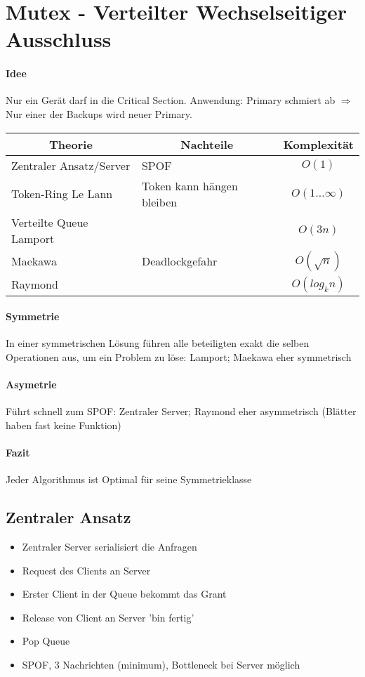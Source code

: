 \documentclass{scrartcl}
\begin{document}
%
%

\section{Mutex - Verteilter Wechselseitiger Ausschluss} \label{mutex}
\paragraph{Idee} Nur ein Gerät darf in die Critical Section. Anwendung: Primary schmiert ab $\Rightarrow$ Nur einer der Backups wird neuer Primary. \\

\begin{center}
\begin{tabular}{l|l|c}
	\multicolumn{1}{c|}{\textbf{Theorie}} & 
	\multicolumn{1}{c|}{\textbf{Nachteile}} & 
	\multicolumn{1}{l}{\textbf{Komplexität}} \\ 
\hline
Zentraler Ansatz/Server & SPOF & $O(1)$ \\
Token-Ring Le Lann& Token kann hängen bleiben & $O(1 \ldots \infty)$ \\
Verteilte Queue Lamport &  & $O(3n)$ \\
Maekawa & Deadlockgefahr & $O(\sqrt{n})$ \\
Raymond & & $O(log_k n)$
\end{tabular}
\end{center}

\paragraph{Symmetrie} In einer symmetrischen Lösung führen alle beteiligten exakt die selben Operationen aus, um ein Problem zu löse: Lamport; Maekawa eher symmetrisch 
\paragraph{Asymetrie} Führt schnell zum SPOF: Zentraler Server; Raymond eher asymmetrisch (Blätter haben fast keine Funktion)
\paragraph{Fazit} Jeder Algorithmus ist Optimal für seine Symmetrieklasse

\subsection{Zentraler Ansatz}
\begin{itemize}
\item Zentraler Server serialisiert die Anfragen
\item Request des Clients an Server
\item Erster Client in der Queue bekommt das Grant
\item Release von Client an Server 'bin fertig'
\item Pop Queue
\item[\Lightning] SPOF, 3 Nachrichten (minimum), Bottleneck bei Server möglich
\end{itemize}
\end{document}
